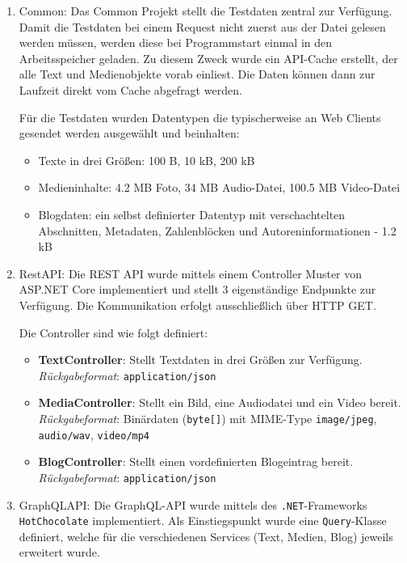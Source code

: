 \begin{enumerate}
	\item Common:
	Das Common Projekt stellt die Testdaten zentral zur Verfügung. Damit die Testdaten bei einem Request nicht zuerst aus der Datei gelesen werden müssen, werden diese bei Programmstart einmal in den Arbeitsspeicher geladen. Zu diesem Zweck wurde ein API-Cache erstellt, der alle Text und Medienobjekte vorab einliest. Die Daten können dann zur Laufzeit direkt vom Cache abgefragt werden.
	
	Für die Testdaten wurden Datentypen die typischerweise an Web Clients gesendet werden ausgewählt und beinhalten:
	
	
	\begin{itemize}
		\item Texte in drei Größen: 100 B, 10 kB, 200 kB
		\item Medieninhalte: 4.2 MB Foto, 34 MB Audio-Datei, 100.5 MB Video-Datei
		\item Blogdaten: ein selbst definierter Datentyp mit verschachtelten Abschnitten, Metadaten, Zahlenblöcken und Autoreninformationen - 1.2 kB
	\end{itemize}
	\item RestAPI:
	Die REST API wurde mittels einem Controller Muster von ASP.NET Core implementiert und stellt 3 eigenständige Endpunkte zur Verfügung. Die Kommunikation erfolgt ausschließlich über HTTP GET.
	
	Die Controller sind wie folgt definiert:
	
	\begin{itemize}
		\item \textbf{TextController}: Stellt Textdaten in drei Größen zur Verfügung.\\
		\emph{Rückgabeformat}: \texttt{application/json}
		\item \textbf{MediaController}: Stellt ein Bild, eine Audiodatei und ein Video bereit.\\
		\emph{Rückgabeformat}: Binärdaten (\texttt{byte[]}) mit MIME-Type \texttt{image/jpeg}, \texttt{audio/wav}, \texttt{video/mp4}
		\item \textbf{BlogController}: Stellt einen vordefinierten Blogeintrag bereit.\\
		\emph{Rückgabeformat}: \texttt{application/json}
	\end{itemize}
	
	\item GraphQLAPI:
	Die GraphQL-API wurde mittels des \texttt{.NET}-Frameworks \texttt{HotChocolate} implementiert.
	Als Einstiegspunkt wurde eine \texttt{Query}-Klasse definiert, welche für die verschiedenen Services (Text, Medien, Blog) jeweils erweitert wurde.
	

\end{enumerate}
